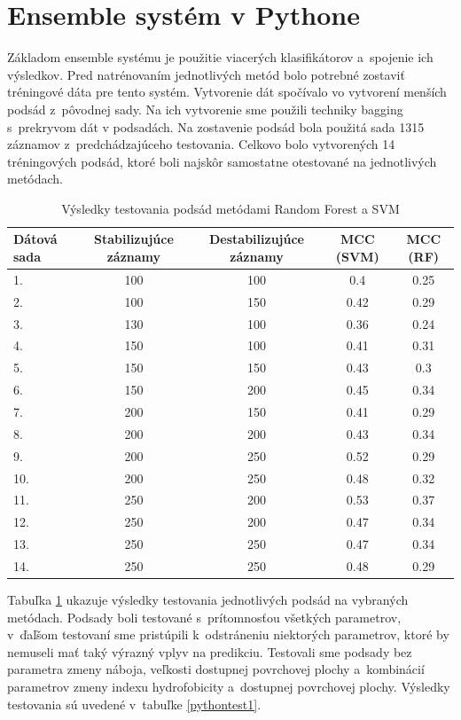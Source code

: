 \section{Ensemble systém v Pythone}

Základom ensemble systému je použitie viacerých klasifikátorov a~spojenie ich výsledkov. Pred natrénovaním jednotlivých metód bolo potrebné zostaviť tréningové dáta pre tento systém. Vytvorenie dát spočívalo vo vytvorení menších podsád z~pôvodnej sady. Na ich vytvorenie sme použili techniky bagging s~prekryvom dát v podsadách. Na zostavenie podsád bola použitá sada 1315 záznamov z~predchádzajúceho testovania. Celkovo bolo vytvorených 14 tréningových podsád, ktoré boli najskôr samostatne otestované na jednotlivých metódach. 
  
\begin{table}[H]
	\centering
	\begin{tabular}{ |l | c | c | c | c|}
		\hline 
		Dátová sada & Stabilizujúce záznamy & Destabilizujúce záznamy & MCC (SVM) & MCC (RF)  \\ \hline
	1. & 100 & 100 & 0.4 & 0.25\\ \hline
	2. & 100 & 150 & 0.42 & 0.29\\ \hline
	3. & 130 & 100 & 0.36 & 0.24\\ \hline
	4. & 150 & 100 & 0.41 & 0.31\\ \hline
	5. & 150 & 150 & 0.43 & 0.3\\ \hline
	6. & 150 & 200 & 0.45 & 0.34\\ \hline
	7. & 200 & 150 & 0.41 & 0.29\\ \hline
	8. & 200 & 200 & 0.43 & 0.34\\ \hline
	9. & 200 & 250 & 0.52 & 0.29\\ \hline
	10. & 200 & 250 & 0.48 & 0.32\\ \hline
	11. & 250 & 200 & 0.53 & 0.37\\ \hline
	12. & 250 & 200 & 0.47 & 0.34\\ \hline
	13. & 250 & 250 & 0.47 & 0.34\\ \hline
	14. & 250 & 250 & 0.48 & 0.29\\ \hline
	\end{tabular}
	\caption {Výsledky testovania podsád metódami Random Forest a SVM} \label{pythontest} 
\end{table}

Tabuľka \ref{pythontest} ukazuje výsledky testovania jednotlivých podsád na vybraných metódach. Podsady boli testované s~prítomnosťou všetkých parametrov, v~ďaľšom testovaní sme pristúpili k~odstráneniu niektorých parametrov, ktoré by nemuseli mať taký výrazný vplyv na predikciu. Testovali sme podsady bez parametra zmeny náboja, veľkosti dostupnej povrchovej plochy a~kombinácií parametrov zmeny indexu hydrofobicity a~dostupnej povrchovej plochy. Výsledky testovania sú uvedené v~tabuľke \ref{pythontest1}.

